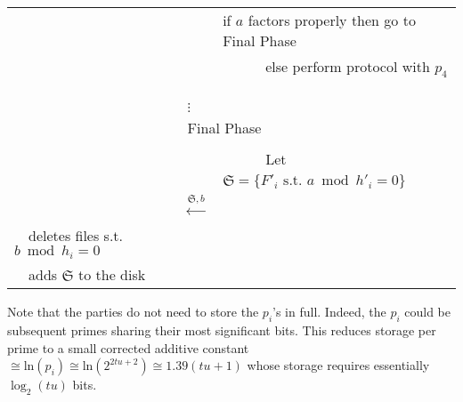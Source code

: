 \documentclass[11pt]{llncs}
\begin{document}
\begin{center}
\begin{tabular}{|lcl|}
                                   &                                                      &if $a$ factors properly then go to {\sf Final Phase}\\
                                   &                                                      &~~~~~~else perform protocol with $p_4$ ~~\\
                                   &                  $\vdots$                            & \\\hline\hline
\multicolumn{3}{|c|}{{\sf Final Phase~~}} \\\hline
                                   &                                                      & \\
                                   &                                                      &~~~~~~Let $\mathfrak{S}=\{F'_i \mbox{~s.t.~} a \bmod h'_i =0\}$~~\\
                                   &~~{\LARGE $\stackrel{\mathfrak{S},b}{\longleftarrow}$}&\\
                                   ~~deletes files s.t. $b \bmod h_i =0$&                                                      &\\
                                   ~~adds $\mathfrak{S}$ to the disk    &                                                      &\\\hline
\end{tabular}
\end{center}

Note that the parties do not need to store the $p_i$'s in full. Indeed, the $p_i$ could be subsequent primes sharing their most significant bits. This reduces storage per prime to a small corrected additive constant $ \cong \mbox{ln}(p_i) \cong \mbox{ln}(2^{2tu+2}) \cong 1.39(tu+1)$ whose storage requires essentially $\log_2(tu)$ bits.
\end{document}
